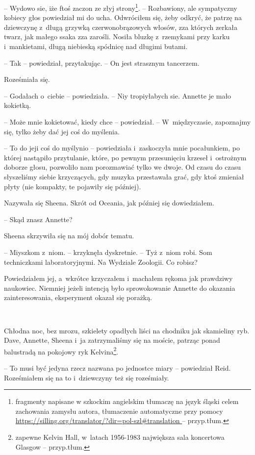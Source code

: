 \documentclass[oneside,polish,11pt,sfheadings]{mwbk}
\begin{document}
-- Wydowo sie, iże ftoś zaczon ze złyj strony\footnote{fragmenty napisane w szkockim angielskim tłumaczę na język śląski celem zachowania zamysłu autora, tłumaczenie automatyczne przy pomocy
\url{https://silling.org/translator/?dir=pol-szl\#translation } -- przyp.tłum.}. -- Rozbawiony, ale
sympatyczny kobiecy głos powiedział mi do ucha. 
Odwróciłem się, żeby odkryć, że patrzę na dziewczynę z~długą grzywką
czerwonobrązowych włosów, zza których zerkała twarz, jak małego ssaka
zza zarośli. Nosiła bluzkę z~rzemykami przy karku i~mankietami, długą
niebieską spódnicę nad długimi butami.

-- Tak -- powiedział, przytakując. -- On jest strasznym tancerzem.

Roześmiała się. 

-- Godałach o~ciebie -- powiedziała. -- Niy tropiyłabych
sie. Annette je mało kokietką.

-- Może mnie kokietować, kiedy chce -- powiedział. -- W~międzyczasie,
zapoznajmy się, tylko żeby dać jej coś do myślenia.

-- To do jeji coś do myślynio -- powiedziała i~zaskoczyła mnie
pocałunkiem, po której nastąpiło przytulanie, które, po pewnym
przesunięciu krzeseł i~ostrożnym doborze głosu, pozwoliło nam
porozmawiać tylko we dwoje. Od czasu do czasu słyszeliśmy siebie
krzyczących, gdy muzyka przestawała grać, gdy ktoś zmieniał płyty (nie
kompakty, te pojawiły się później).

Nazywała się Sheena. Skrót od Oceania, jak później się dowiedziałem.

-- Skąd znasz Annette?

Sheena skrzywiła się na mój dobór tematu. 

-- Miyszkom z~niom. -- krzyknęła
dyskretnie. -- Tyż z~niom robi. Som techniczkami laboratoryjnymi. Na
Wydziale Zoologii. Co robisz?

Powiedziałem jej, a~wkrótce krzyczałem i~machałem rękoma jak prawdziwy
naukowiec. Niemniej jeżeli intencją było sprowokowanie Annette do
okazania zainteresowania, eksperyment okazał się porażką.

~

Chłodna noc, bez mrozu, szkielety opadłych liści na chodniku jak
skamieliny ryb. Dave, Annette, Sheena i~ja zatrzymaliśmy się na moście,
patrząc ponad balustradą na pokojowy ryk Kelvina\footnote{zapewne Kelvin
Hall, w~latach 1956-1983 największa sala koncertowa Glasgow -- przyp.tłum.}.

-- To musi być jedyna rzecz nazwana po jednostce miary -- powiedział Reid.
Roześmiałem się na to i~dziewczyny też się roześmiały.
\end{document}
